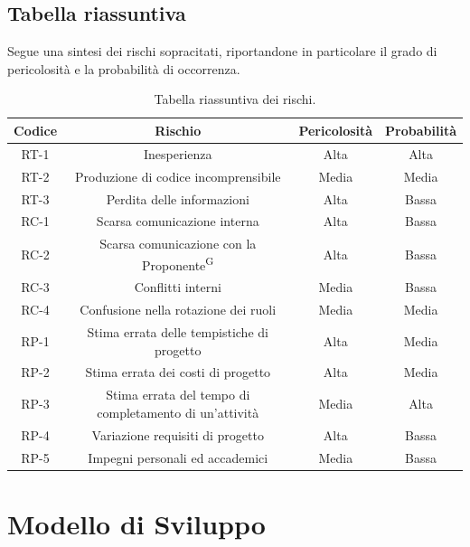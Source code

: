 \documentclass[8pt]{article}
\newcommand{\glossterm}[1]{#1\textsuperscript{G}} %
\begin{document}
\subsection{Tabella riassuntiva}
Segue una sintesi dei rischi sopracitati, riportandone in particolare il grado di pericolosità e la probabilità di occorrenza.

\begin{table}[ht!]
    \centering
    \renewcommand{\arraystretch}{1.25}
    \begin{tabular}{cccc}
        \toprule
        \textbf{Codice} & \textbf{Rischio} & \textbf{Pericolosità} & \textbf{Probabilità} \\ \midrule
        RT-1 & Inesperienza & Alta & Alta \\ 
        RT-2 & Produzione di codice incomprensibile & Media & Media \\ 
        RT-3 & Perdita delle informazioni & Alta & Bassa \\ 
        RC-1 & Scarsa comunicazione interna & Alta & Bassa \\ 
        RC-2 & Scarsa comunicazione con la \glossterm{Proponente} & Alta & Bassa \\ 
        RC-3 & Conflitti interni & Media & Bassa \\ 
        RC-4 & Confusione nella rotazione dei ruoli & Media & Media \\ 
        RP-1 & Stima errata delle tempistiche di progetto & Alta & Media \\ 
        RP-2 & Stima errata dei costi di progetto & Alta & Media \\ 
        RP-3 & Stima errata del tempo di completamento di un'attività & Media & Alta \\ 
        RP-4 & Variazione requisiti di progetto & Alta & Bassa \\ 
        RP-5 & Impegni personali ed accademici & Media & Bassa \\ 
        \bottomrule
    \end{tabular}
    \caption{Tabella riassuntiva dei rischi.}
    \label{table:Tabella riassuntiva dei rischi}
\end{table}
\newpage

\section{Modello di Sviluppo} \label{sec:modello}
\end{document}
